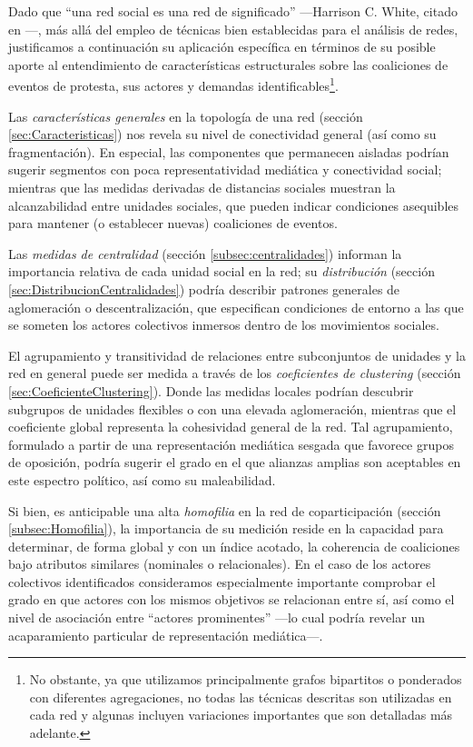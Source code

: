 \documentclass[letterpaper, 11pt]{book}
\theoremstyle{definition}
\theoremstyle{remark}
\begin{document}
Dado que ``una red social es una red de significado'' ---Harrison C. White, citado en \citep[5]{2003_Diani_SocialNetworks}---, más allá del empleo de técnicas bien establecidas para el análisis de redes, justificamos a continuación su aplicación específica en términos de su posible aporte al entendimiento de características estructurales sobre las coaliciones de eventos de protesta, sus actores y demandas identificables\footnote{
    No obstante, ya que utilizamos principalmente grafos bipartitos o ponderados con diferentes agregaciones, no todas las técnicas descritas son utilizadas en cada red y algunas incluyen variaciones importantes que son detalladas más adelante. 
}. 


Las \emph{características generales} en la topología de una red (sección \ref{sec:Caracteristicas}) nos revela su nivel de conectividad general (así como su fragmentación). 
En especial, las componentes que permanecen aisladas podrían sugerir segmentos con poca representatividad mediática y conectividad social; mientras que las medidas derivadas de distancias sociales muestran la alcanzabilidad entre unidades sociales, que pueden indicar condiciones asequibles para mantener (o establecer nuevas) coaliciones de eventos. 


Las \emph{medidas de centralidad} (sección \ref{subsec:centralidades}) informan la importancia relativa de cada unidad social en la red; 
su \emph{distribución} (sección \ref{sec:DistribucionCentralidades}) podría describir patrones generales de aglomeración o descentralización, que especifican condiciones de entorno a las que se someten los actores colectivos inmersos dentro de los movimientos sociales. 


El agrupamiento y transitividad de relaciones entre subconjuntos de unidades y la red en general puede ser medida a través de los \emph{coeficientes de clustering} (sección \ref{sec:CoeficienteClustering}). 
Donde las medidas locales podrían descubrir subgrupos de unidades flexibles o con una elevada aglomeración, mientras que el coeficiente global representa la cohesividad general de la red. 
Tal agrupamiento, formulado a partir de una representación mediática sesgada que favorece grupos de oposición, podría sugerir el grado en el que alianzas amplias son aceptables en este espectro político, así como su maleabilidad. 


Si bien, es anticipable una alta \emph{homofilia} en la red de coparticipación (sección \ref{subsec:Homofilia}), la importancia de su medición reside en la capacidad para determinar, de forma global y con un índice acotado, la coherencia de coaliciones bajo atributos similares (nominales o relacionales). 
En el caso de los actores colectivos identificados consideramos especialmente importante comprobar el grado en que actores con los mismos objetivos se relacionan entre sí, así como el nivel de asociación entre ``actores prominentes'' ---lo cual podría revelar un acaparamiento particular de representación mediática---. 
\end{document}

